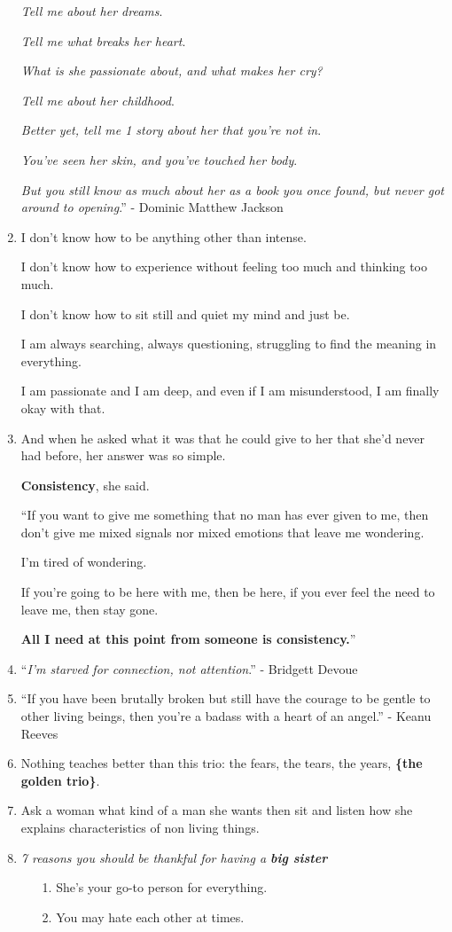 \documentclass{article}
\begin{document}
\begin{enumerate}
	\textit{Tell me about her dreams}.
	
	\textit{Tell me what breaks her heart}.
	
	\textit{What is she passionate about, and what makes her cry?}
	
	\textit{Tell me about her childhood}.
	
	\textit{Better yet, tell me 1 story about her that you're not in}.
	
	\textit{You've seen her skin, and you've touched her body}.
	
	\textit{But you still know as much about her as a book you once found, but never got around to opening}.'' - Dominic Matthew Jackson
	\item I don't know how to be anything other than intense.
	
	I don't know how to experience without feeling too much and thinking too much.
	
	I don't know how to sit still and quiet my mind and just be.
	
	I am always searching, always questioning, struggling to find the meaning in everything.
	
	I am passionate and I am deep, and even if I am misunderstood, I am finally okay with that.
	\item And when he asked what it was that he could give to her that she'd never had before, her answer was so simple.
	
	\textbf{Consistency}, she said.
	
	``If you want to give me something that no man has ever given to me, then don't give me mixed signals nor mixed emotions that leave me wondering.
	
	I'm tired of wondering.
	
	If you're going to be here with me, then be here, if you ever feel the need to leave me, then stay gone.
	
	\textbf{All I need at this point from someone is consistency.}''
	\item ``\textit{I'm starved for connection, not attention}.'' - Bridgett Devoue
	\item ``If you have been brutally broken but still have the courage to be gentle to other living beings, then you're a badass with a heart of an angel.'' - Keanu Reeves
	\item Nothing teaches better than this trio: the fears, the tears, the years, \textbf{\{the golden trio\}}.
	\item Ask a woman what kind of a man she wants then sit and listen how she explains characteristics of non living things.
	\item \textit{7 reasons you should be thankful for having a \textbf{big sister}}
	\begin{itemize}
		\item[1.] She's your go-to person for everything.
		\item[2.] You may hate each other at times.
		

\end{itemize}
\end{enumerate}
\end{document}
